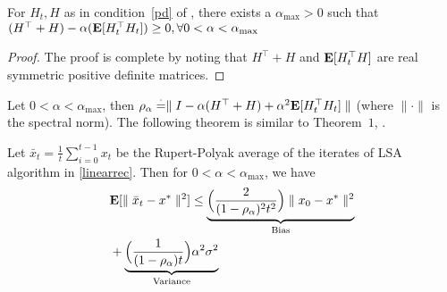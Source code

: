 \begin{lemma}\label{alphacond}
For $H_t, H$ as in condition~\ref{pd} of , there exists a $\alpha_{\max}>0$ such that $(H^\top+H)-\alpha (\mathbf{E}[H_t^\top H_t])\geq 0, \forall 0< \alpha<\alpha_{\max}$ 
\end{lemma}
\begin{proof}
The proof is complete by noting that $H^\top+H$ and $\mathbf{E}[H^\top_t H]$ are real symmetric positive definite matrices.
\end{proof}
Let $0<\alpha<\alpha_{\max}$, then $\rho_{\alpha}\stackrel{\cdot}{=}\parallel I-\alpha(H^\top+H)+\alpha^2\mathbf{E}[H^\top_t H_t]\parallel$ (where $\parallel\cdot\parallel$ is the spectral norm). The following theorem is similar to Theorem~$1$, \cite{bachaistats}.
\begin{theorem}\label{maintheorem}
Let $\bar{x}_t=\frac{1}{t}\sum_{i=0}^{t-1} x_t$ be the Rupert-Polyak average of the iterates of LSA algorithm in \eqref{linearrec}. Then for $0<\alpha< \alpha_{\max}$, we have
\begin{align}
&\mathbf{E}[\parallel \bar{x}_t-x^*\parallel^2]\leq \underbrace{\Big(\frac{2}{(1-\rho_{\alpha})^2t^2}\Big)\parallel x_0-x^*\parallel^2}_{\text{Bias}}\\&+\underbrace{\Big(\frac{1}{(1-\rho_{\alpha})t}\Big)\alpha^2\sigma^2}_{\text{Variance}}
\end{align}
\end{theorem}
